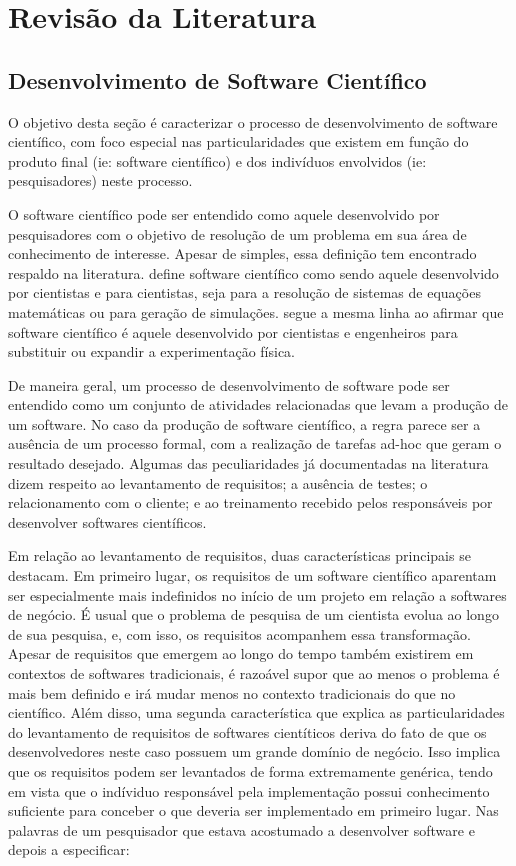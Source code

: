 \documentclass[
	article,			%
	11pt,				%
	oneside,			%
	a4paper,			%
	english,			%
	brazil,				%
	sumario=tradicional
	]{abntex2}
\begin{document}
\section*{Revisão da Literatura}

\subsection{Desenvolvimento de Software Científico}
O objetivo desta seção é caracterizar o processo de desenvolvimento de software científico, com foco especial nas particularidades que existem em função do produto final (ie: software científico) e dos indivíduos envolvidos (ie: pesquisadores) neste processo.

O software científico pode ser entendido como aquele desenvolvido por pesquisadores com o objetivo de resolução de um problema em sua área de conhecimento de interesse. Apesar de simples, essa definição tem encontrado respaldo na literatura.  define software científico como sendo aquele desenvolvido por cientistas e para cientistas, seja para a resolução de sistemas de equações matemáticas ou para geração de simulações.  segue a mesma linha ao afirmar que software científico é aquele desenvolvido por cientistas e engenheiros para substituir ou expandir a experimentação física.

De maneira geral, um processo de desenvolvimento de software pode ser entendido como um conjunto de atividades relacionadas que levam a produção de um software. No caso da produção de software científico, a regra parece ser a ausência de um processo formal, com a realização de tarefas ad-hoc que geram o resultado desejado. Algumas das peculiaridades já documentadas na literatura dizem respeito ao levantamento de requisitos; a ausência de testes; o relacionamento com o cliente; e ao treinamento recebido pelos responsáveis por desenvolver softwares científicos.

Em relação ao levantamento de requisitos, duas características principais se destacam. Em primeiro lugar, os requisitos de um software científico aparentam ser especialmente mais indefinidos no início de um projeto em relação a softwares de negócio. É usual que o problema de pesquisa de um cientista evolua ao longo de sua pesquisa, e, com isso, os requisitos acompanhem essa transformação. Apesar de requisitos que emergem ao longo do tempo também existirem em contextos de softwares tradicionais, é razoável supor que ao menos o problema é mais bem definido e irá mudar menos no contexto tradicionais do que no científico. Além disso, uma segunda característica que explica as particularidades do levantamento de requisitos de softwares cientíticos deriva do fato de que os desenvolvedores neste caso possuem um grande domínio de negócio. Isso implica que os requisitos podem ser levantados de forma extremamente genérica, tendo em vista que o indíviduo responsável pela implementação possui conhecimento suficiente para conceber o que deveria ser implementado em primeiro lugar. Nas palavras de um pesquisador que estava acostumado a desenvolver software e depois a especificar:
\end{document}
